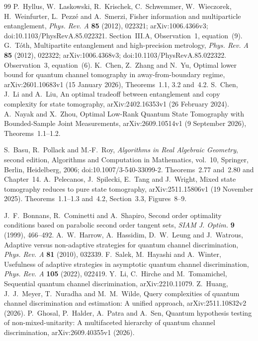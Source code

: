 \begin{thebibliography}{99}
 P.~Hyllus, W.~Laskowski, R.~Krischek,
C.~Schwemmer, W.~Wieczorek, H.~Weinfurter, L.~Pezz\'e and A.~Smerzi,
Fisher information and multiparticle entanglement,
\emph{Phys. Rev. A} \textbf{85} (2012), 022321;
arXiv:1006.4366v3; doi:10.1103/PhysRevA.85.022321.
Section~III.A, Observation~1, equation~(9).
 G.~T\'oth,
Multipartite entanglement and high-precision metrology,
\emph{Phys. Rev. A} \textbf{85} (2012), 022322;
arXiv:1006.4368v3; doi:10.1103/PhysRevA.85.022322.
Observation~3, equation~(6).
 K.~Chen, Z.~Zhang and N.~Yu,
Optimal lower bound for quantum channel tomography in away-from-boundary regime,
arXiv:2601.10683v1 (15 January 2026), Theorems~1.1, 3.2 and~4.2.
 S.~Chen, J.~Li and A.~Liu,
An optimal tradeoff between entanglement and copy complexity for state tomography,
arXiv:2402.16353v1 (26 February 2024).
 A.~Nayak and X.~Zhou,
Optimal Low-Rank Quantum State Tomography with Bounded-Sample Joint Measurements,
arXiv:2609.10514v1 (9 September 2026), Theorems~1.1--1.2.

 S.~Basu, R.~Pollack and M.-F.~Roy,
\emph{Algorithms in Real Algebraic Geometry}, second edition,
Algorithms and Computation in Mathematics, vol.~10,
Springer, Berlin, Heidelberg, 2006;
doi:10.1007/3-540-33099-2.
Theorems~2.77 and~2.80 and Chapter~14.
 A.~Pelecanos, J.~Spilecki, E.~Tang and J.~Wright,
Mixed state tomography reduces to pure state tomography,
arXiv:2511.15806v1 (19 November 2025).
Theorems~1.1--1.3 and~4.2, Section~3.3, Figures~8--9.


 J.~F.~Bonnans, R.~Cominetti and A.~Shapiro,
Second order optimality conditions based on parabolic second order
tangent sets, \emph{SIAM J. Optim.} \textbf{9} (1999), 466--492.
 A.~W.~Harrow, A.~Hassidim, D.~W.~Leung and J.~Watrous,
Adaptive versus non-adaptive strategies for quantum channel
discrimination, \emph{Phys. Rev. A} \textbf{81} (2010), 032339.
 F.~Salek, M.~Hayashi and A.~Winter,
Usefulness of adaptive strategies in asymptotic quantum channel
discrimination, \emph{Phys. Rev. A} \textbf{105} (2022), 022419.
 Y.~Li, C.~Hirche and M.~Tomamichel,
Sequential quantum channel discrimination, arXiv:2210.11079.
 Z.~Huang, J.~J.~Meyer, T.~Nuradha and M.~M.~Wilde,
Query complexities of quantum channel discrimination and estimation:
A unified approach, arXiv:2511.10832v2 (2026).
 P.~Ghosal, P.~Halder, A.~Patra and A.~Sen,
Quantum hypothesis testing of non-mixed-unitarity: A multifaceted
hierarchy of quantum channel discrimination, arXiv:2609.40355v1 (2026).
\end{thebibliography}
